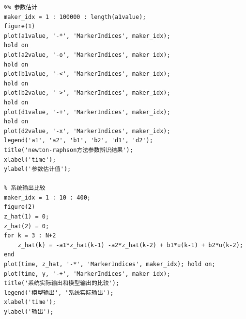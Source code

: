 \documentclass[UTF8, twocolumn]{article}
\begin{document}
\begin{lstlisting}
%% 参数估计
maker_idx = 1 : 100000 : length(a1value);
figure(1)
plot(a1value, '-*', 'MarkerIndices', maker_idx);
hold on
plot(a2value, '-o', 'MarkerIndices', maker_idx);
hold on
plot(b1value, '-<', 'MarkerIndices', maker_idx);
hold on
plot(b2value, '->', 'MarkerIndices', maker_idx);
hold on
plot(d1value, '-+', 'MarkerIndices', maker_idx);
hold on
plot(d2value, '-x', 'MarkerIndices', maker_idx);
legend('a1', 'a2', 'b1', 'b2', 'd1', 'd2');
title('newton-raphson方法参数辨识结果');
xlabel('time');
ylabel('参数估计值');

% 系统输出比较
maker_idx = 1 : 10 : 400;
figure(2)
z_hat(1) = 0;
z_hat(2) = 0;
for k = 3 : N+2
	z_hat(k) = -a1*z_hat(k-1) -a2*z_hat(k-2) + b1*u(k-1) + b2*u(k-2);
end
plot(time, z_hat, '-*', 'MarkerIndices', maker_idx); hold on;
plot(time, y, '-+', 'MarkerIndices', maker_idx); 
title('系统实际输出和模型输出的比较');
legend('模型输出', '系统实际输出');
xlabel('time');
ylabel('输出');	
\end{lstlisting}
\end{document}
